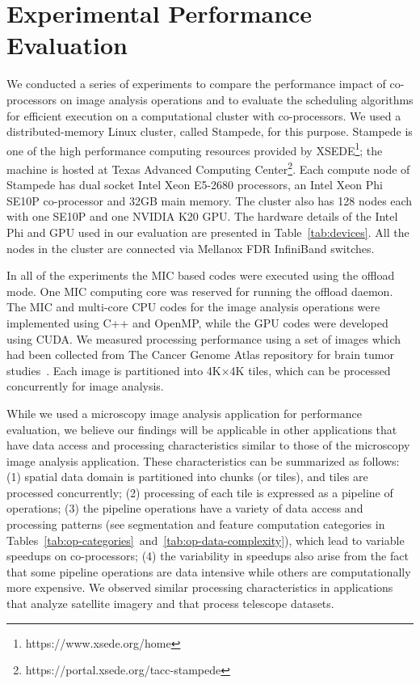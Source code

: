 \section{Experimental Performance Evaluation} \label{sec:results}
We conducted a series of experiments to compare the performance impact of 
co-processors on image analysis operations and to evaluate the 
scheduling algorithms for efficient execution on a computational cluster with 
co-processors. We used a distributed-memory Linux cluster, called Stampede, for this 
purpose. Stampede is one of the high performance computing resources provided by 
XSEDE\footnote{https://www.xsede.org/home}; the machine is hosted at Texas Advanced 
Computing Center\footnote{https://portal.xsede.org/tacc-stampede}. 
Each compute node of Stampede has dual socket Intel Xeon E5-2680 processors, an Intel 
Xeon Phi SE10P co-processor and 32GB main memory. The cluster also has 
128 nodes each with one SE10P and one NVIDIA K20 GPU. 
The hardware details of the Intel Phi and GPU used in our evaluation
are presented in Table~\ref{tab:devices}. All the nodes in the cluster 
are connected via Mellanox FDR InfiniBand switches. 

In all of the experiments the MIC based codes were executed using the offload mode. One MIC computing 
core was reserved for running the offload daemon. The MIC and multi-core CPU codes for the 
image analysis operations were implemented using C++ and OpenMP, while the GPU codes were 
developed using CUDA. We measured processing performance using a 
set of images which had been collected from The Cancer Genome Atlas repository for brain 
tumor studies~\cite{kong2013machine}. Each image is partitioned into 4K$\times$4K tiles, which 
can be processed concurrently for image analysis.

While we used a microscopy image analysis application for performance evaluation, we believe our 
findings will be applicable in other applications that have data access and processing 
characteristics similar to those of the microscopy image analysis application. These characteristics 
can be summarized as follows: (1) spatial data domain is partitioned into chunks (or tiles), and 
tiles are processed concurrently; (2) processing of each tile is expressed as a 
pipeline of operations; (3) the pipeline operations have a variety 
of data access and processing patterns (see segmentation and feature computation categories in 
Tables~\ref{tab:op-categories}~and~\ref{tab:op-data-complexity}), which lead to variable speedups on 
co-processors; (4) the variability in speedups also arise from the fact that some pipeline operations 
are data intensive while others are computationally more expensive. We observed similar 
processing characteristics in applications that analyze satellite imagery and that process telescope 
datasets. 

